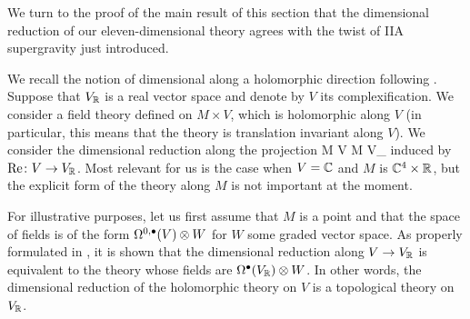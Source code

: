 
\parsec[-]

We turn to the proof of the main result of this section that the dimensional reduction of our eleven-dimensional theory agrees with the twist of IIA supergravity just introduced. 

We recall the notion of dimensional along a holomorphic direction following \cite{ESW}. 
Suppose that $V_\mathbb R$ is a real vector space and denote by $V$ its complexification. 
We consider a field theory defined on $M \times V$, which is holomorphic along $V$ (in particular, this means that the theory is translation invariant along $V$).  
We consider the dimensional reduction along the projection 
\beqn\label{eqn:dimred}
M \times V \to M \times V_\RR
\eeqn
induced by ${\rm Re} \colon V \to V_\mathbb R$.
Most relevant for us is the case when $V = \mathbb C$ and $M$ is $\mathbb C^4 \times \mathbb R$, but the explicit form of the theory along $M$ is not important at the moment.

For illustrative purposes, let us first assume that $M$ is a point and that the space of fields is of the form $\Omega^{0,\bullet}(V) \otimes W$ for $W$ some graded vector space. 
As properly formulated in \cite{ESW}, it is shown that the dimensional reduction along $V \to V_\mathbb R$ is equivalent to the theory whose fields are $\Omega^\bullet(V_\mathbb R) \otimes W$. 
In other words, the dimensional reduction of the holomorphic theory on $V$ is a topological theory on $V_\mathbb R$. 


